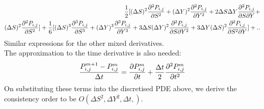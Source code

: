 \documentclass{article}
\begin{document}
\begin{enumerate}
\begin{align*}
\frac{1}{2}[(\Delta{S})^2\pdv[2]{P_{i,j}}{S} + (\Delta{Y})^2\pdv[2]{P_{i,j}}{Y} + 2\Delta{S}\Delta{Y}\pdv{P_{i,j}}{S}{Y} +  \\ 
(\Delta{S})^2\pdv[2]{P_{i,j}}{S} ]
+ \frac{1}{6} [(\Delta{S})^3\pdv[3]{P_{i,j}}{S} +( \Delta{Y})^3\pdv[3]{P_{i,j}}{Y} + 3\Delta{S}(\Delta{Y})^2\pdv{P_{i,j}}{S}{Y^2}+ 
3\Delta{Y}(\Delta{S})^2\pdv[3]{P_{i,j}}{S^2}{Y} ] + ..
\end{align*}
Similar expressions for the other mixed derivatives. \\
The approximation to the time derivative is also needed:
\begin{align*}
\frac{P^{m+1}_{i,j}-P^{m}_{i,j}}{\Delta{t}}  = \pdv{P^m_{i,j}}{t} + \frac{\Delta{t}}{2}\pdv[2]{P^m_{i,j}}{t} 
\end{align*}
On substituting these terms into the discretised PDE above, we derive the consistency order to be $O( \Delta{S}^2, \Delta{Y}^2, \Delta{t},)$.


\end{enumerate}
\end{document}
